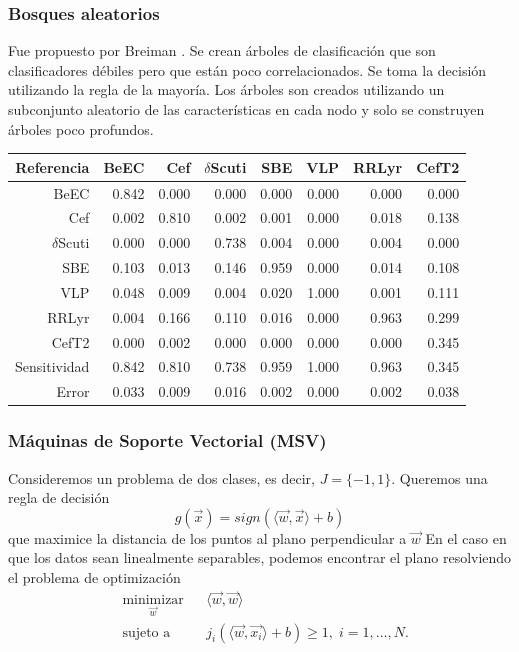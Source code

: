\documentclass{beamer}
\begin{document}
\begin{frame}
  \frametitle{Bosques aleatorios}
  Fue propuesto por Breiman \cite{breiman_random_2001}. Se crean árboles de clasificación que son clasificadores débiles pero que están poco correlacionados. Se toma la decisión utilizando la regla de la mayoría. Los árboles son creados utilizando un subconjunto aleatorio de las características en cada nodo y solo se construyen árboles poco profundos.
  \begin{table}[ht]
    \centering
    \resizebox{0.7\textwidth}{!} {
      \begin{tabular}{rrrrrrrr}
        \hline
        Referencia & BeEC & Cef & $\delta$Scuti & SBE & VLP & RRLyr & CefT2 \\ 
        \hline
        BeEC & 0.842 & 0.000 & 0.000 & 0.000 & 0.000 & 0.000 & 0.000 \\ 
        Cef & 0.002 & 0.810 & 0.002 & 0.001 & 0.000 & 0.018 & 0.138 \\ 
        $\delta$Scuti & 0.000 & 0.000 & 0.738 & 0.004 & 0.000 & 0.004 & 0.000 \\ 
        SBE & 0.103 & 0.013 & 0.146 & 0.959 & 0.000 & 0.014 & 0.108 \\ 
        VLP & 0.048 & 0.009 & 0.004 & 0.020 & 1.000 & 0.001 & 0.111 \\ 
        RRLyr & 0.004 & 0.166 & 0.110 & 0.016 & 0.000 & 0.963 & 0.299 \\ 
        CefT2 & 0.000 & 0.002 & 0.000 & 0.000 & 0.000 & 0.000 & 0.345 \\
        \hline
        Sensitividad &  0.842 & 0.810 & 0.738 & 0.959 & 1.000 & 0.963 & 0.345 \\
        \hline
        Error & 0.033 & 0.009 & 0.016 & 0.002 & 0.000 & 0.002 & 0.038 \\ 
        \hline
      \end{tabular}
    }
  \end{table}
\end{frame}



\begin{frame}
\frametitle{Máquinas de Soporte Vectorial (MSV)}
Consideremos un problema de dos clases, es decir, $J=\{-1,1\}$. Queremos una regla de decisión 
\begin{equation}
g(\vec{x}) = sign(\langle \vec{w}, \vec{x}\rangle + b)
\end{equation}
que maximice la distancia de los puntos al plano perpendicular a $\vec{w}$
En el caso en que los datos sean linealmente separables, podemos encontrar el plano resolviendo el problema de optimización
\begin{equation*}
\begin{aligned}
& \underset{\vec{w}}{\text{minimizar}}
& & \langle \vec{w}, \vec{w} \rangle \\
& \text{sujeto a}
& & j_i(\langle \vec{w}, \vec{x_i}\rangle + b)\geq 1, \; i = 1, \ldots, N.
\end{aligned}
\end{equation*}
\end{frame}
\end{document}

